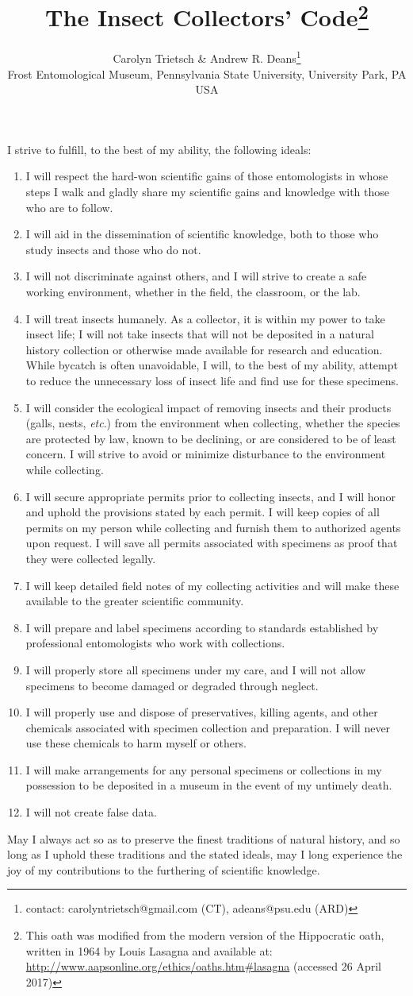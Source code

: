 \documentclass[letterpaper, 10pt]{article}
\title{\textbf{The Insect Collectors' Code}\footnote{This oath was modified from the modern version of the Hippocratic oath, written in 1964 by Louis Lasagna and available at: \url{http://www.aapsonline.org/ethics/oaths.htm\#lasagna} (accessed 26 April 2017)}}
\author{Carolyn Trietsch \& Andrew R. Deans\footnote{contact:  carolyntrietsch@gmail.com (CT), adeans@psu.edu (ARD)}\\Frost Entomological Museum, Pennsylvania State University, University Park, PA  USA}
\begin{document}
\cleanlookdateon %
\maketitle

\noindent{}I strive to fulfill, to the best of my ability, the following ideals:

\begin{enumerate}
\item I will respect the hard-won scientific gains of those entomologists in whose steps I walk and gladly share my scientific gains and knowledge with those who are to follow.
\item I will aid in the dissemination of scientific knowledge, both to those who study insects and those who do not.
\item I will not discriminate against others, and I will strive to create a safe working environment, whether in the field, the classroom, or the lab.
\item I will treat insects humanely. As a collector, it is within my power to take insect life; I will not take insects that will not be deposited in a natural history collection or otherwise made available for research and education. While bycatch is often unavoidable, I will, to the best of my ability, attempt to reduce the unnecessary loss of insect life and find use for these specimens.
\item I will consider the ecological impact of removing insects and their products (galls, nests, \textit{etc}.) from the environment when collecting, whether the species are protected by law, known to be declining, or are considered to be of least concern. I will strive to avoid or minimize disturbance to the environment while collecting.
\item I will secure appropriate permits prior to collecting insects, and I will honor and uphold the provisions stated by each permit. I will keep copies of all permits on my person while collecting and furnish them to authorized agents upon request. I will save all permits associated with specimens as proof that they were collected legally.
\item I will keep detailed field notes of my collecting activities and will make these available to the greater scientific community.
\item I will prepare and label specimens according to standards established by professional entomologists who work with collections.
\item I will properly store all specimens under my care, and I will not allow specimens to become damaged or degraded through neglect.
\item I will properly use and dispose of preservatives, killing agents, and other chemicals associated with specimen collection and preparation. I will never use these chemicals to harm myself or others.
\item I will make arrangements for any personal specimens or collections in my possession to be deposited in a museum in the event of my untimely death.
\item I will not create false data.
\end{enumerate}
 
\noindent{}May I always act so as to preserve the finest traditions of natural history, and so long as I uphold these traditions and the stated ideals, may I long experience the joy of my contributions to the furthering of scientific knowledge. 
\vfill
\end{document}

